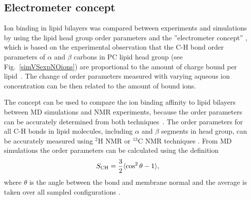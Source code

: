 \documentclass[aip,jcp,twocolumn]{revtex4}
\begin{document}



\subsection{Electrometer concept} \label{section:electrometer}
Ion binding in lipid bilayers was compared between experiments and simulations by 
using the lipid head group order parameters and the
''electrometer concept'' \cite{seelig87,catte16}, which
is based on the experimental observation that the C-H bond
order parameters of $\alpha$ and $\beta$ carbons in PC lipid head group
(see Fig.~\ref{simVSexpNOions}) are proportional to the amount 
of charge bound per lipid~\cite{seelig87}.
The change of order parameters measured with varying aqueous
ion concentration can be then related to the amount of bound ions.

The concept can be used to compare the ion binding affinity to lipid 
bilayers between MD simulations and  NMR experiments, because the order
parameters can be accurately determined from both techniques~\cite{catte16,ollila16}.
The order parameters for all C-H bonds in lipid molecules, including
$\alpha$ and $\beta$ segments in head group, can be accurately measured
using $^2$H NMR or $^{13}$C NMR techniques \cite{ollila16}. From MD simulations the
order parameters can be calculated using the definition
\begin{equation}\label{OP}
S_{\rm CH}=\frac{3}{2}\langle \cos^2\theta -1 \rangle,
\end{equation}
where $\theta$ is the angle between the bond and membrane
normal and the average is taken over all sampled configurations \cite{ollila16}.
\end{document}
